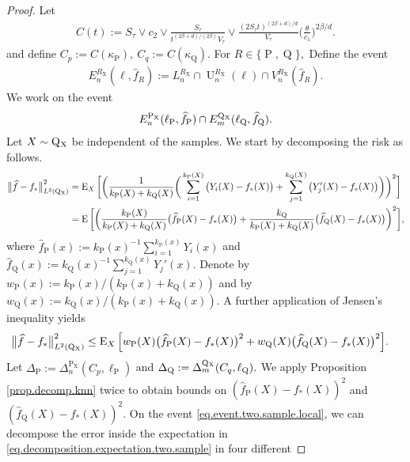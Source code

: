 \documentclass[10pt,a4paper]{amsart}
\newcommand{\E}{\operatorname{E}}
\renewcommand{\P}{\operatorname{P}}
\newcommand{\Q}{\operatorname{Q}}
\newcommand{\U}{\operatorname{U}}
\renewcommand{\k}{\kappa}
\newcommand{\sX}{\mathrm{X}}
\newcommand{\wh}{\widehat}
\begin{document}
\begin{proof}
    Let 
    \begin{align*}
        C(t) := S_\tau\vee c_2 \vee \frac{S_\tau}{t^{(2\beta + d)/(2\beta)}V_\tau} \vee \frac{(2S_\tau t)^{(2\beta + d)/d}}{V_\tau}\bigg(\frac{\theta}{c_1}\bigg)^{2\beta/d}.
    \end{align*}
    and define $C_p := C(\k_{\P}), \ C_q := C(\k_{\Q}).$ For $R \in \{\P, \Q\},$ Define the event
    \begin{align*}
        E_n^{R_{\sX}}(\ell, \wh f_R) := L_n^{R_{\sX}} \cap \U_n^{R_{\sX}}(\ell) \cap V_n^{R_{\sX}}(\wh f_R).
    \end{align*}
    We work on the event
    \begin{align}
        \label{eq.event.two.sample.local}
        E_n^{\P_{\sX}}(\ell_{\P}, \wh f_{\P}) \cap E_m^{\Q\mathstrut_{\!\sX}}(\ell_{\Q}, \wh f_{\Q}).
    \end{align}
   Let $X \sim \Q\mathstrut_{\!\sX}$ be independent of the samples. We start by decomposing the risk as follows.
    \begin{align*}
        \big\|\wh f - f_*\big\|_{L^2(\Q\mathstrut_{\!\sX})}^2 &= \E_X\bigg[\bigg(\frac{1}{k_{\P}(X) + k_{\Q}(X)}\bigg(\sum_{i=1}^{k_{\P}(X)}\big(Y_i(X) - f_*(X)\big) + \sum_{j=1}^{k_{\Q}(X)} \big(Y_j'(X) - f_*(X)\big)\bigg)\bigg)^2\bigg]\\
        &= \E\bigg[\bigg(\frac{k_{\P}(X)}{k_{\P}(X) + k_{\Q}(X)}\big(\wh f_{\P}(X) - f_*(X)\big) + \frac{k_{\Q}}{k_{\P}(X) + k_{\Q}(X)}\big(\wh f_{\Q}(X) - f_*(X)\big)\bigg)^2\bigg],
    \end{align*}
    where $\wh f_{\P}(x) := k_{\P}(x)^{-1}\sum_{i=1}^{k_{\P}(x)} Y_i(x)$ and $\wh f_{\Q}(x) := k_{\Q}(x)^{-1}\sum_{j=1}^{k_{\Q}(x)} Y_j'(x).$ Denote by $w_{\P}(x) := k_{\P}(x)/(k_{\P}(x) + k_{\Q}(x))$ and by $w_{\Q}(x) := k_{\Q}(x)/(k_{\P}(x) + k_{\Q}(x)).$ A further application of Jensen's inequality yields
    \begin{align}
        \label{eq.decomposition.expectation.two.sample}
        \big\|\wh f - f_*\big\|_{L^2(\Q\mathstrut_{\!\sX})}^2 &\leq \E_X\Big[w_{\P}(X)\big(\wh f_{\P}(X) - f_*(X)\big)^2 + w_{\Q}(X) \big(\wh f_{\Q}(X) - f_*(X)\big)^2\Big].
    \end{align}
    Let $\Delta_{\P} := \Delta_n^{\P_{\sX}}(C_p, \ell_{\P})$ and $\Delta_{\Q} := \Delta_m^{\Q\mathstrut_{\!\sX}}(C_q, \ell_{\Q}).$ We apply Proposition \ref{prop.decomp.knn} twice to obtain bounds on $(\wh f_{\P}(X) - f_*(X))^2$ and $(\wh f_{\Q}(X) - f_*(X))^2.$ On the event \eqref{eq.event.two.sample.local}, we can decompose the error inside the expectation in \eqref{eq.decomposition.expectation.two.sample} in four different

\end{proof}
\end{document}
